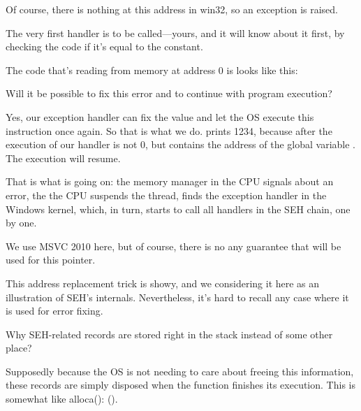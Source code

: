 Of course, there is nothing at this address in win32, so an exception is raised.

The very first handler is to be called---yours, and it will know about it first, by checking
the code if it's equal to the  constant.

The code that's reading from memory at address 0 is looks like this:



Will it be possible to fix this error  and to continue with program execution?

Yes, our exception handler can fix the \EAX value and let the \ac{OS} execute this instruction once again.
So that is what we do. \printf prints 1234, because after the execution of our handler \EAX is not 0,
but contains the address of the global variable .
The execution will resume.

That is what is going on: the memory manager in the \ac{CPU} signals about an error, the the \ac{CPU} suspends the thread,
finds the exception handler in the Windows kernel, 
which, in turn, starts to call all handlers in the \ac{SEH} chain, one by one.

We use MSVC 2010 here, but of course, there is no any guarantee that \EAX will be used for this pointer.

This address replacement trick is showy, and we considering it here as an illustration of \ac{SEH}'s internals.
Nevertheless, it's hard to recall any case where it is used for  error fixing.

Why SEH-related records are stored right in the stack instead of some other place?

Supposedly because the \ac{OS} is not needing to care about freeing this information, 
these records are simply disposed when the function finishes its execution.
This is somewhat like alloca(): ().

